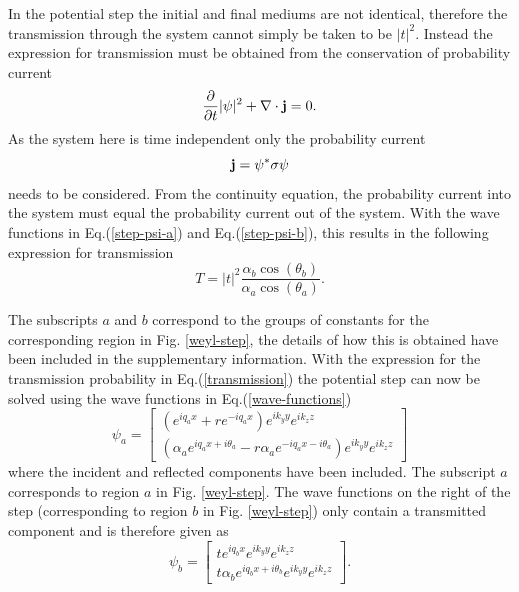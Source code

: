 \documentclass[prb,twocolumn,aps,superscriptaddress,showpacs,floatfix]{revtex4}
\begin{document}
	In the potential step the initial and final mediums are not identical, therefore the transmission through the system cannot simply be taken to be $|t|^{2}$. Instead the expression for transmission must be obtained from the conservation of probability current \cite{b13,b40}
	\begin{equation}
		\frac{\partial}{\partial t}|\psi|^{2}+\nabla\cdot {\bf j}=0.
	\end{equation}
	As the system here is time independent only the probability current
	\begin{equation}
		{\bf j} =\psi^{*} {\bf \sigma} \psi
	\end{equation}
	needs to be considered. From the continuity equation, the probability current into the system must equal the probability current out of the system. With the wave functions in Eq.(\ref{step-psi-a}) and Eq.(\ref{step-psi-b}), this results in the following expression for transmission
\begin{equation}
	T=|t|^{2}\frac{\alpha_{b}\cos\left(\theta_{b}\right)}{\alpha_{a}\cos\left(\theta_{a}\right)}.
	\label{transmission}
\end{equation}
	
	The subscripts $a$ and $b$ correspond to the groups of constants for the corresponding region in Fig. \ref{weyl-step}, the details of how this is obtained have been included in the supplementary information. With the expression for the transmission probability in Eq.(\ref{transmission}) the potential step can now be solved using the wave functions in Eq.(\ref{wave-functions})
		\begin{equation}
			\psi_{a}=
			\left[\begin{array}{ccc}
				\left(e^{iq_{a}x}+re^{-iq_{a}x}\right)e^{ik_{y}y}e^{ik_{z}z}\\
				\left(\alpha_{a}e^{iq_{a}x+i\theta_{a}}-r\alpha_{a}e^{-iq_{a}x-i\theta_{a}}\right)e^{ik_{y}y}e^{ik_{z}z}
			\end{array}\right]
			\label{step-psi-a}
		\end{equation}
		where the incident and reflected components have been included. The subscript $a$ corresponds to region $a$ in Fig. \ref{weyl-step}. The wave functions on the right of the step (corresponding to region $b$ in Fig. \ref{weyl-step}) only contain a transmitted component and is therefore given as
		\begin{equation}
			\psi_{b}=
			\left[\begin{array}{ccc}
				te^{iq_{b}x}e^{ik_{y}y}e^{ik_{z}z}\\
				t\alpha_{b}e^{iq_{b}x+i\theta_{b}}e^{ik_{y}y}e^{ik_{z}z}
			\end{array}\right].
			\label{step-psi-b}
		\end{equation}
\end{document}
